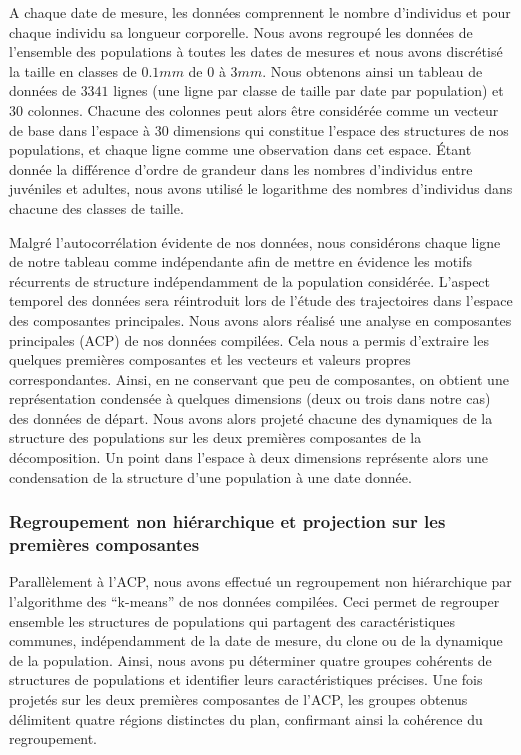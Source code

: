 A chaque date de mesure, les données comprennent le nombre d'individus et pour
chaque individu sa longueur corporelle. Nous avons regroupé les données de
l'ensemble des populations à toutes les dates de mesures et nous avons
discrétisé la taille en classes de $0.1mm$ de $0$ à $3mm$. Nous obtenons ainsi
un tableau de données de $3341$ lignes (une ligne par classe de taille par date
par population) et $30$ colonnes. Chacune des colonnes peut alors être
considérée comme un vecteur de base dans l'espace à $30$ dimensions qui constitue l'espace
des structures de nos populations, et chaque ligne comme une observation dans
cet espace. Étant donnée la différence d'ordre de grandeur dans les nombres
d'individus entre juvéniles et adultes, nous avons utilisé le logarithme des
nombres d'individus dans chacune des classes de taille.

Malgré l'autocorrélation évidente de nos données, nous considérons chaque ligne
de notre tableau comme indépendante afin de mettre en évidence les motifs
récurrents de structure indépendamment de la population considérée. L'aspect
temporel des données sera réintroduit lors de l'étude des trajectoires dans
l'espace des composantes principales. Nous avons alors réalisé une analyse en
composantes principales (ACP) de nos données compilées.
Cela nous a permis d'extraire les quelques premières composantes et les vecteurs
et valeurs propres correspondantes. Ainsi, en ne conservant que peu de
composantes, on obtient une représentation condensée à quelques dimensions (deux
ou trois dans notre cas) des données de départ. Nous avons alors projeté chacune
des dynamiques de la structure des populations sur les deux premières
composantes de la décomposition. Un point dans l'espace à deux dimensions
représente alors une condensation de la structure d'une population à une date donnée.

\subsubsection{Regroupement non hiérarchique et projection sur les premières
composantes}

Parallèlement à l'ACP, nous avons effectué un regroupement non hiérarchique par
l'algorithme des ``k-means'' de nos données compilées. Ceci permet de regrouper
ensemble les structures de populations qui partagent des caractéristiques
communes, indépendamment de la date de mesure, du clone ou de la dynamique de la
population. Ainsi, nous avons pu déterminer quatre groupes cohérents de
structures de populations et identifier leurs caractéristiques précises. Une
fois projetés sur les deux premières composantes de l'ACP, les groupes obtenus
délimitent quatre régions distinctes du plan, confirmant ainsi la cohérence du
regroupement. 
 

